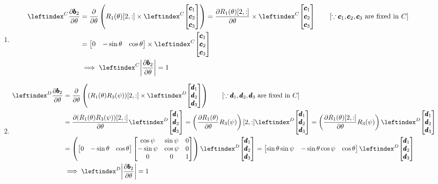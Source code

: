 \begin{enumerate}
\item
\begin{align*}
    \lx{^C}{\frac {\partial \pmb b_2}  {\partial \theta}} &= \frac {\partial}  {\partial \theta} \left( R_1(\theta)[2,:] \times \lx{^C}{\bm{\pmb c_1 \\ \pmb c_2 \\ \pmb c_3}} \right)
    = \frac{\partial R_1(\theta)[2,:]}{\partial \theta} \times \lx{^C}{\bm{\pmb c_1 \\ \pmb c_2 \\ \pmb c_3}}
    \qquad \left[\because \pmb c_1, \pmb c_2, \pmb c_3 \text{ are fixed in } C \right]\\
    &= \bm{0 & -\sin \theta & \cos \theta} \times \lx{^C}{\bm{\pmb c_1 \\ \pmb c_2 \\ \pmb c_3}}\\
    &\implies \lx{^C}{\norm{\frac {\partial \pmb b_2}  {\partial \theta}}} = 1
\end{align*}


 \item
 \begin{align*}
    \lx{^D}{\frac {\partial \pmb b_2}  {\partial \theta}} &= \frac {\partial}  {\partial \theta} \left((R_1(\theta) R_3(\psi))[2,:] \times \lx{^D}{\bm{\pmb d_1 \\ \pmb d_2 \\ \pmb d_3}} \right)
    \qquad \left[\because \pmb d_1, \pmb d_2, \pmb d_3 \text{ are fixed in } C \right]\\
    &= \frac{\partial (R_1(\theta) R_3(\psi))[2,:]}{\partial \theta} \lx{^D}{\bm{\pmb d_1 \\ \pmb d_2 \\ \pmb d_3}}
    = \left(\frac{\partial R_1(\theta) }{\partial \theta} R_3(\psi) \right) [2,:]\lx{^D}{\bm{\pmb d_1 \\ \pmb d_2 \\ \pmb d_3}}
    = \left(\frac{\partial R_1(\theta)[2,:] }{\partial \theta} R_3(\psi) \right)\lx{^D}{\bm{\pmb d_1 \\ \pmb d_2 \\ \pmb d_3}}\\
    &=  \left( \bm{0 & -\sin \theta & \cos \theta}
    \bm{
            \cos \psi & \sin \psi  & 0\\
            -\sin \psi & \cos \psi & 0\\
            0          & 0         & 1
        } \right)\lx{^D}{\bm{\pmb d_1 \\ \pmb d_2 \\ \pmb d_3}}
    = \bm{\sin \theta \sin \psi & -\sin \theta \cos \psi & \cos \theta} \lx{^D}{\bm{\pmb d_1 \\ \pmb d_2 \\ \pmb d_3}}\\
    &\implies  \lx{^D}{\norm{\frac {\partial \pmb b_2}  {\partial \theta}}} = 1
 \end{align*}


\end{enumerate}
